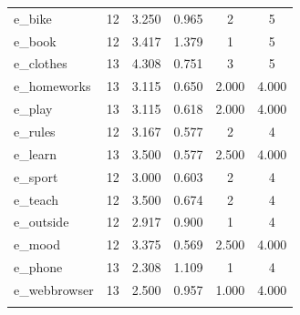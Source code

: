 \documentclass{article}
\begin{document}
\begin{table}[!htbp]
\begin{tabular}{@{\extracolsep{5pt}}lccccc}
e\_bike & 12 & 3.250 & 0.965 & 2 & 5 \\ 
e\_book & 12 & 3.417 & 1.379 & 1 & 5 \\ 
e\_clothes & 13 & 4.308 & 0.751 & 3 & 5 \\ 
e\_homeworks & 13 & 3.115 & 0.650 & 2.000 & 4.000 \\ 
e\_play & 13 & 3.115 & 0.618 & 2.000 & 4.000 \\ 
e\_rules & 12 & 3.167 & 0.577 & 2 & 4 \\ 
e\_learn & 13 & 3.500 & 0.577 & 2.500 & 4.000 \\ 
e\_sport & 12 & 3.000 & 0.603 & 2 & 4 \\ 
e\_teach & 12 & 3.500 & 0.674 & 2 & 4 \\ 
e\_outside & 12 & 2.917 & 0.900 & 1 & 4 \\ 
e\_mood & 12 & 3.375 & 0.569 & 2.500 & 4.000 \\ 
e\_phone & 13 & 2.308 & 1.109 & 1 & 4 \\ 
e\_webbrowser & 13 & 2.500 & 0.957 & 1.000 & 4.000 \\ 
\hline \\[-1.8ex] 
\end{tabular} 
\end{table} 
\end{document}
